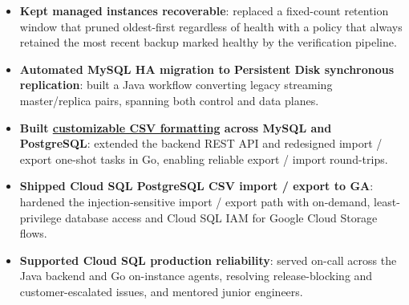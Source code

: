 \documentclass{resume}
\begin{document}
\begin{itemize}
  \item \textbf{Kept managed instances recoverable}: replaced a fixed-count retention window that pruned oldest-first regardless of health with a policy that always retained the most recent backup marked healthy by the verification pipeline.
  \item \textbf{Automated MySQL HA migration to Persistent Disk synchronous replication}: built a Java workflow converting legacy streaming master/replica pairs, spanning both control and data planes.
  \item \textbf{Built \href{https://cloud.google.com/sql/docs/postgres/import-export/import-export-csv}{customizable CSV formatting} across MySQL and PostgreSQL}: extended the backend REST API and redesigned import / export one-shot tasks in Go, enabling reliable export / import round-trips.
  \item \textbf{Shipped Cloud SQL PostgreSQL CSV import / export to GA}: hardened the injection-sensitive import / export path with on-demand, least-privilege database access and Cloud SQL IAM for Google Cloud Storage flows.
  \item \textbf{Supported Cloud SQL production reliability}: served on-call across the Java backend and Go on-instance agents, resolving release-blocking and customer-escalated issues, and mentored junior engineers.
\end{itemize}
\end{document}
